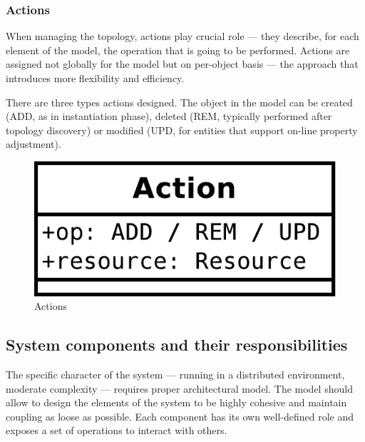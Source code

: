 \documentclass[11pt]{book}
\begin{document}
        \subsubsection{Actions}

          When managing the topology, actions play crucial role --- they describe, for each element of the model, the
          operation that is going to be performed. Actions are assigned not globally for the model but on per-object
          basis --- the approach that introduces more flexibility and efficiency.

          There are three types actions designed. The object in the model can be created (ADD, as in instantiation
          phase), deleted (REM, typically performed after topology discovery) or modified (UPD, for entities that
          support on-line property adjustment).

          \begin{figure}[H]
            \begin{center}
              \includegraphics[scale=.5]{img/architecture/actions.pdf}
            \end{center}

            \caption{Actions}
          \end{figure}


      \subsection{System components and their responsibilities}

        The specific character of the system --- running in a distributed environment, moderate complexity --- requires
        proper architectural model. The model should allow to design the elements of the system to be highly cohesive
        and maintain coupling as loose as possible. Each component has its own well-defined role and exposes a set of
        operations to interact with others.
\end{document}
